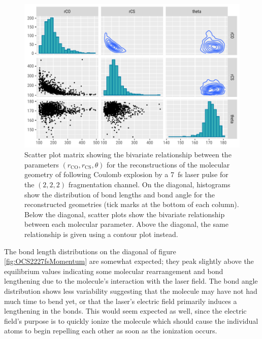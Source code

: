 \begin{figure}
  \centering
  \includegraphics[width=\textwidth]{Plots/OCS2227fsMOGeometryPairs}
  \caption[Scatter plot matrix showing the bivariate relationship between the parameters $(r_\mathrm{CO}, r_\mathrm{CS}, \theta)$ for the reconstructions of the molecular geometry of  following Coulomb explosion by a \SI{7}{\fs} laser pulse for the $(2,2,2)$ fragmentation channel.]
  {Scatter plot matrix showing the bivariate relationship between the parameters $(r_\mathrm{CO}, r_\mathrm{CS}, \theta)$ for the reconstructions of the molecular geometry of  following Coulomb explosion by a \SI{7}{\fs} laser pulse for the $(2,2,2)$ fragmentation channel. On the diagonal, histograms show the distribution of bond lengths and bond angle for the reconstructed geometries (tick marks at the bottom of each column). Below the diagonal, scatter plots show the bivariate relationship between each molecular parameter. Above the diagonal, the same relationship is given using a contour plot instead.}
  \label{fig:OCS2227fsMOGeometryPairs}
\end{figure}

The bond length distributions on the diagonal of figure \ref{fig:OCS2227fsMomentum} are somewhat expected; they peak slightly above the equilibrium values indicating some molecular rearrangement and bond lengthening due to the molecule's interaction with the laser field. The bond angle distribution shows less variability suggesting that the molecule may have not had much time to bend yet, or that the laser's electric field primarily induces a lengthening in the bonds. This would seem expected as well, since the electric field's purpose is to quickly ionize the molecule which should cause the individual atoms to begin repelling each other as soon as the ionization occurs. %


